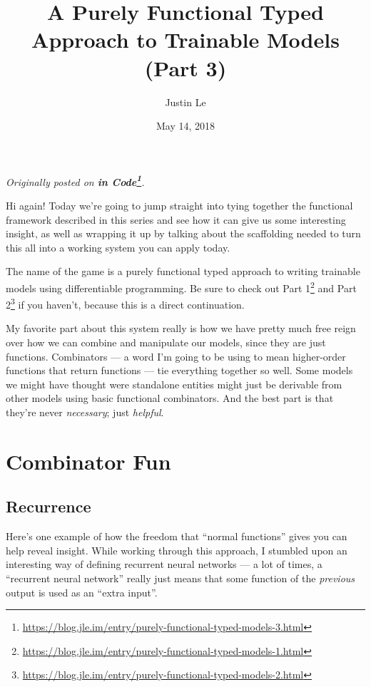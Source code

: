 \documentclass[]{article}
\title{A Purely Functional Typed Approach to Trainable Models (Part 3)}
\author{Justin Le}
\date{May 14, 2018}
\renewcommand{\href}[2]{#2\footnote{\url{#1}}}
\begin{document}
\maketitle

\emph{Originally posted on
\textbf{\href{https://blog.jle.im/entry/purely-functional-typed-models-3.html}{in
Code}}.}

Hi again! Today we're going to jump straight into tying together the functional
framework described in this series and see how it can give us some interesting
insight, as well as wrapping it up by talking about the scaffolding needed to
turn this all into a working system you can apply today.

The name of the game is a purely functional typed approach to writing trainable
models using differentiable programming. Be sure to check out
\href{https://blog.jle.im/entry/purely-functional-typed-models-1.html}{Part 1}
and \href{https://blog.jle.im/entry/purely-functional-typed-models-2.html}{Part
2} if you haven't, because this is a direct continuation.

My favorite part about this system really is how we have pretty much free reign
over how we can combine and manipulate our models, since they are just
functions. Combinators --- a word I'm going to be using to mean higher-order
functions that return functions --- tie everything together so well. Some models
we might have thought were standalone entities might just be derivable from
other models using basic functional combinators. And the best part is that
they're never \emph{necessary}; just \emph{helpful}.

\hypertarget{combinator-fun}{%
\section{Combinator Fun}\label{combinator-fun}}

\hypertarget{recurrence}{%
\subsection{Recurrence}\label{recurrence}}

Here's one example of how the freedom that ``normal functions'' gives you can
help reveal insight. While working through this approach, I stumbled upon an
interesting way of defining recurrent neural networks --- a lot of times, a
``recurrent neural network'' really just means that some function of the
\emph{previous} output is used as an ``extra input''.
\end{document}
